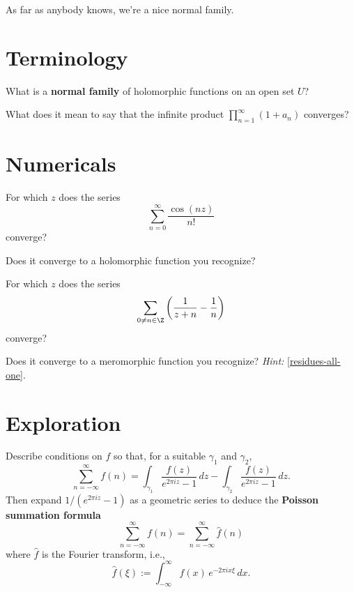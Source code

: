 \documentclass{homework}
\author{Jim Fowler}
\begin{document}
\maketitle

\begin{inspiration} %
  As far as anybody knows, we're a nice normal family.
\end{inspiration}

\section{Terminology}

\begin{problem}
  What is a \textbf{normal family} of holomorphic functions on an open set $U$?
\end{problem}

\begin{problem}
  What does it mean to say that the infinite product
  \(
    \prod_{n=1}^\infty \left( 1 + a_n \right)
  \)
  converges?
\end{problem}

\section{Numericals}

\begin{problem}
  For which $z$ does the series
  \[
    \sum_{n=0}^\infty \frac{\cos \left( nz \right)}{n!}
  \]
  converge?

  Does it converge to a holomorphic function you recognize?
\end{problem}

\begin{problem}
  For which $z$ does the series
  \[
    \sum_{0 \neq n \in \Z} \left( \frac{1}{z+n} - \frac{1}{n} \right)
  \]
  converge?

  Does it converge to a meromorphic function you recognize?
  \textit{Hint:} \ref{residues-all-one}.
\end{problem}

\section{Exploration}

\begin{problem}\label{poisson-summation}Describe conditions on $f$ so
  that, for a suitable $\gamma_1$ and $\gamma_2$,
  \[
    \sum_{n=-\infty}^\infty f(n) = \int_{\gamma_1} \frac{f(z)}{e^{2\pi i z} - 1} \, dz - \int_{\gamma_2} \frac{f(z)}{e^{2\pi i z} - 1} \, dz.
  \]
  Then expand $1/(e^{2\pi i z} - 1)$ as a geometric series to deduce the \textbf{Poisson summation formula}
  \[
    \sum_{n=-\infty}^\infty f(n) = \sum_{n=-\infty}^\infty \hat{f}(n) 
  \]
  where $\hat{f}$ is the Fourier transform, i.e.,
  \[
    {\hat {f}}(\xi ) := \int _{-\infty }^{\infty} f(x) \, e^{-2\pi ix \xi} \,dx.
  \]
\end{problem}
\end{document}
